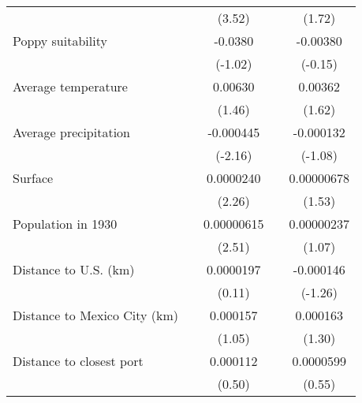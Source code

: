 {\begin{tabular}{l*{4}{c}}
                    &                     &      (3.52)         &                     &      (1.72)         \\
[1em]
Poppy suitability   &                     &     -0.0380         &                     &    -0.00380         \\
                    &                     &     (-1.02)         &                     &     (-0.15)         \\
[1em]
Average temperature &                     &     0.00630         &                     &     0.00362         \\
                    &                     &      (1.46)         &                     &      (1.62)         \\
[1em]
Average precipitation&                     &   -0.000445\sym{*}  &                     &   -0.000132         \\
                    &                     &     (-2.16)         &                     &     (-1.08)         \\
[1em]
Surface             &                     &   0.0000240\sym{*}  &                     &  0.00000678         \\
                    &                     &      (2.26)         &                     &      (1.53)         \\
[1em]
Population in 1930  &                     &  0.00000615\sym{*}  &                     &  0.00000237         \\
                    &                     &      (2.51)         &                     &      (1.07)         \\
[1em]
Distance to U.S. (km)&                     &   0.0000197         &                     &   -0.000146         \\
                    &                     &      (0.11)         &                     &     (-1.26)         \\
[1em]
Distance to Mexico City (km)&                     &    0.000157         &                     &    0.000163         \\
                    &                     &      (1.05)         &                     &      (1.30)         \\
[1em]
Distance to closest port&                     &    0.000112         &                     &   0.0000599         \\
                    &                     &      (0.50)         &                     &      (0.55)         \\

\end{tabular}}
